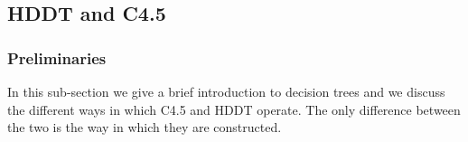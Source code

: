\documentclass{acm_proc_article-sp}
\begin{document}





\subsection{HDDT and C4.5}
\label{Sect.4.4}
\subsubsection{Preliminaries}
In this sub-section we give a brief introduction to decision trees and we discuss the different ways in which C4.5 and HDDT operate. The only difference between the two is the way in which they are constructed. 
\end{document}
